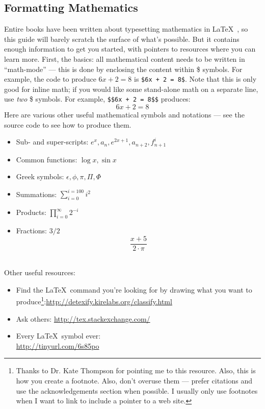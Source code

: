 \subsection{Formatting Mathematics}
\label{subsec:math}

Entire books have been written about typesetting mathematics in
\LaTeX~, so this guide will barely scratch the surface of what's
possible. But it contains enough information to get you started, with
pointers to resources where you can learn more. First, the basics: all
mathematical content needs to be written in ``math-mode'' --- this is
done by enclosing the content within \$ symbols. For example, the code
to produce $6x + 2 = 8$ is \texttt{\$6x + 2 = 8\$}. Note that this is
only good for inline math; if you would like some stand-alone math on
a separate line, use \emph{two} \$ symbols. For example,
\texttt{\$\$6x + 2 = 8\$\$} produces: $$6x+2 = 8$$ Here are various
other useful mathematical symbols and notations --- see the source
code to see how to produce them.

\begin{itemize}
  \item Sub- and super-scripts: $e^{x}, a_{n}, e^{2x+1}, a_{n+2}, f^{i}_{n+1}$
  \item Common functions: $\log{x}, \sin{x}$
  \item Greek symbols: $\epsilon, \phi, \pi, \Pi, \Phi$ %
  \item Summations: $\sum_{i=0}^{i=100} i^{2}$ %
  \item Products: $\prod_{i=0}^{\infty} 2^{-i}$
  \item Fractions: $3/2$ %
    $$\frac{x + 5}{2 \cdot \pi}$$\\ %
\end{itemize}

\noindent Other useful resources:
\begin{itemize}
\item Find the \LaTeX~command you're looking for by drawing what you
  want to produce\footnote{Thanks to Dr. Kate Thompson for pointing me
    to this resource. Also, this is how you create a footnote. Also,
    don't overuse them --- prefer citations and use the
    acknowledgements section when possible. I usually only use
    footnotes when I want to link to include a pointer to a web
    site.}:\url{http://detexify.kirelabs.org/classify.html}
\item Ask others: \url{http://tex.stackexchange.com/}
\item Every \LaTeX~symbol ever:\\ \url{http://tinyurl.com/6s85po}

\end{itemize}


